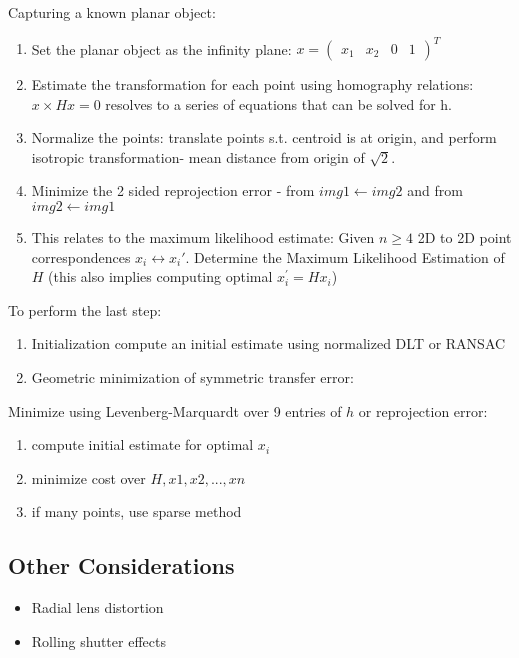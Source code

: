 Capturing a known planar object:

\begin{enumerate}
\item Set the planar object as the infinity plane: $x = ( \begin{matrix} x_1 & x_2 & 0 & 1 \end{matrix})^T$
\item Estimate the transformation for each point using homography relations: $ x \times H x = 0$ resolves to a series of equations that can be solved for h.
\item Normalize the points: translate points s.t. centroid is at origin, and perform isotropic transformation- mean distance from origin of $\sqrt 2 $. 
\item Minimize the 2 sided reprojection error - from $img1 \leftarrow img2$ and from $img2 \leftarrow img1$
\item This relates to the maximum likelihood estimate:
	Given $n\ge 4$ 2D to 2D point correspondences {$x_i\leftrightarrow x_i\prime$}. 
	Determine the Maximum Likelihood Estimation of $H$ (this also implies computing optimal $x_i^\prime=Hx_i$) 
\end{enumerate}

To perform the last step: 
\begin{enumerate}
\item Initialization compute an initial estimate using normalized DLT or RANSAC
\item Geometric minimization of symmetric transfer error: 
\end{enumerate}

Minimize using Levenberg-Marquardt over 9 entries of $h$ or reprojection error:
\begin{enumerate}
\item compute initial estimate for optimal $x_i$
\item minimize cost over ${H,x1,x2,...,xn}$
\item if many points, use sparse method
\end{enumerate}

\subsection{Other Considerations}
\begin{itemize}
\item Radial lens distortion
\item Rolling shutter effects
\end{itemize}

